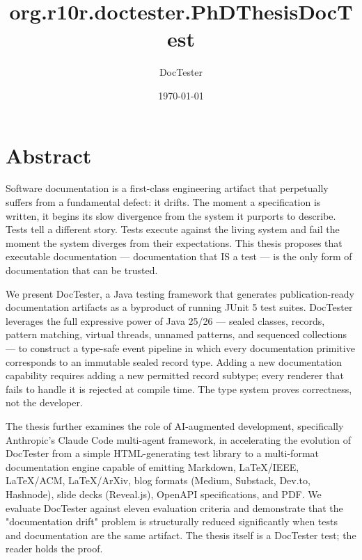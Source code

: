 \documentclass[11pt]{article}
\begin{document}
\title{org.r10r.doctester.PhDThesisDocTest}
\author{DocTester}
\date{\today}
\maketitle


\section{Abstract}

Software documentation is a first-class engineering artifact that perpetually suffers from a fundamental defect: it drifts. The moment a specification is written, it begins its slow divergence from the system it purports to describe. Tests tell a different story. Tests execute against the living system and fail the moment the system diverges from their expectations. This thesis proposes that executable documentation — documentation that IS a test — is the only form of documentation that can be trusted.

We present DocTester, a Java testing framework that generates publication-ready documentation artifacts as a byproduct of running JUnit 5 test suites. DocTester leverages the full expressive power of Java 25/26 — sealed classes, records, pattern matching, virtual threads, unnamed patterns, and sequenced collections — to construct a type-safe event pipeline in which every documentation primitive corresponds to an immutable sealed record type. Adding a new documentation capability requires adding a new permitted record subtype; every renderer that fails to handle it is rejected at compile time. The type system proves correctness, not the developer.

The thesis further examines the role of AI-augmented development, specifically Anthropic's Claude Code multi-agent framework, in accelerating the evolution of DocTester from a simple HTML-generating test library to a multi-format documentation engine capable of emitting Markdown, LaTeX/IEEE, LaTeX/ACM, LaTeX/ArXiv, blog formats (Medium, Substack, Dev.to, Hashnode), slide decks (Reveal.js), OpenAPI specifications, and PDF. We evaluate DocTester against eleven evaluation criteria and demonstrate that the "documentation drift" problem is structurally reduced significantly when tests and documentation are the same artifact. The thesis itself is a DocTester test; the reader holds the proof.
\end{document}

